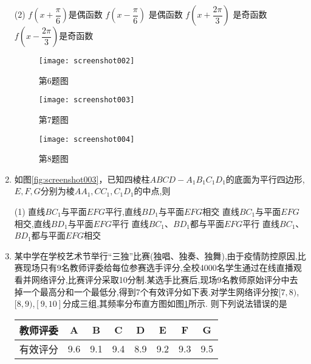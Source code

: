 \documentclass[11pt]{article}
\begin{document}
\begin{enumerate}
		\begin{tasks}(2)
			\task $ f\left ( x+\dfrac{\pi}{6}  \right )  $是偶函数
			\task $ f\left ( x-\dfrac{\pi}{6}  \right ) $ 是偶函数
			\task $ f\left ( x+\dfrac{2\pi}{3}  \right ) $ 是奇函数
			\task $ f\left ( x-\dfrac{2\pi}{3}  \right ) $是奇函数
		\end{tasks}
	\begin{figure}
		\centering
		\begin{minipage}{200pt}
			\centering
			\texttt{[image: screenshot002]}
			\caption{\heiti 第6题图}
			\label{fig:screenshot002}
		\end{minipage}
		\begin{minipage}{190pt}
			\centering
			\texttt{[image: screenshot003]}
			\caption{\heiti 第7题图}
			\label{fig:screenshot003}
		\end{minipage}
		\begin{minipage}{200pt}
			\centering
			\texttt{[image: screenshot004]}
			\caption{\heiti 第8题图}
			\label{fig:screenshot004}
		\end{minipage}
	\end{figure}
	
	
	
	\item 如图\ref{fig:screenshot003}，已知四棱柱$ ABCD-A_1B_1C_1D_1 $的底面为平行四边形,$ E,F,G $分别为棱$ AA_1,CC_1,C_1D_1 $的中点,则
	\begin{tasks}(1)
		\task 直线$ BC_1 $与平面$ EFG $平行,直线$ BD_1 $与平面$ EFG $相交
		\task 直线$ BC_1 $与平面$ EFG $相交,直线$ BD_1 $与平面$ EFG $平行
		\task 直线$ BC_1 $、$ BD_1 $都与平面$ EFG $平行
		\task 直线$ BC_1 $、$ BD_1 $都与平面$ EFG $相交
	\end{tasks}
	\item 某中学在学校艺术节举行“三独”比赛(独唱、独奏、独舞),由于疫情防控原因,比赛现场只有9名教师评委给每位参赛选手评分,全校4000名学生通过在线直播观看并网络评分,比赛评分采取10分制.某选手比赛后,现场9名教师原始评分中去掉一个最高分和一个最低分,得到7个有效评分如下表.对学生网络评分按$ [7,8) $,$ [8,9) $,$ [9,10] $分成三组,其频率分布直方图如图\ref{fig:screenshot004}所示. 则下列说法错误的是
	\begin{table}[htbp]
	\centering
	\begin{tabular}{c|c|c|c|c|c|c|c}
		\hline
		教师评委 & A & B & C & D & E & F & G \\
		\hline 
		有效评分 & 9.6 & 9.1 & 9.4 & 8.9 & 9.2 & 9.3 & 9.5 \\
		\hline
	\end{tabular}
	\end{table}


\end{enumerate}
\end{document}
